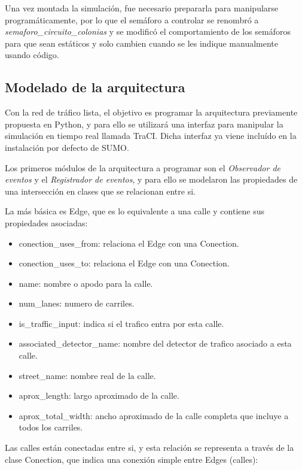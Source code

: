 Una vez montada la simulación, fue necesario prepararla para manipularse
programáticamente, por lo que el semáforo a controlar se renombró a
\emph{semaforo\_circuito\_colonias} y se modificó el comportamiento de
los semáforos para que sean estáticos y solo cambien cuando se les
indique manualmente usando código.

\hypertarget{modelado-de-la-arquitectura}{%
\subsection{Modelado de la
arquitectura}\label{modelado-de-la-arquitectura}}

Con la red de tráfico lista, el objetivo es programar la arquitectura
previamente propuesta en Python, y para ello se utilizará una interfaz
para manipular la simulación en tiempo real llamada TraCI. Dicha
interfaz ya viene incluído en la instalación por defecto de SUMO.

Los primeros módulos de la arquitectura a programar son el
\emph{Observador de eventos} y el \emph{Registrador de eventos}, y para
ello se modelaron las propiedades de una intersección en clases que se
relacionan entre si.

La más básica es Edge, que es lo equivalente a una calle y contiene sus
propiedades asociadas:

\begin{itemize}
\item
  conection\_uses\_from: relaciona el Edge con una Conection.
\item
  conection\_uses\_to: relaciona el Edge con una Conection.
\item
  name: nombre o apodo para la calle.
\item
  num\_lanes: numero de carriles.
\item
  is\_traffic\_input: indica si el trafico entra por esta calle.
\item
  associated\_detector\_name: nombre del detector de trafico asociado a
  esta calle.
\item
  street\_name: nombre real de la calle.
\item
  aprox\_length: largo aproximado de la calle.
\item
  aprox\_total\_width: ancho aproximado de la calle completa que incluye
  a todos los carriles.
\end{itemize}

Las calles están conectadas entre si, y esta relación se representa a
través de la clase Conection, que indica una conexión simple entre Edges
(calles):

